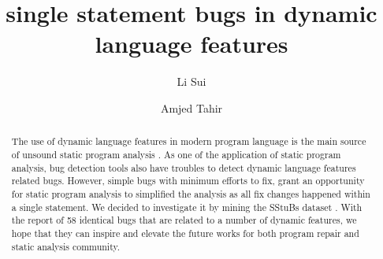 \documentclass[sigconf,review,anonymous]{acmart}
\begin{document}
\title{single statement bugs in dynamic language features}


\author{Li Sui}

\author{Amjed Tahir}



\begin{abstract}

The use of dynamic language features in modern program language is the main source of unsound static program analysis \cite{livshits2015defense, sui2018soundness}. As one of the application of static program analysis, bug detection tools also have troubles to detect dynamic language features related bugs. However, simple bugs with minimum efforts to fix,  grant an opportunity for static program analysis to simplified the analysis as all fix changes happened within a single statement. We decided to investigate it by mining the SStuBs dataset \cite{karampatsis2020often}. With the report of 58 identical bugs that are related to a number of dynamic features, we hope that they can inspire and elevate the future works for both program repair and static analysis community.
\end{abstract}
\end{document}
